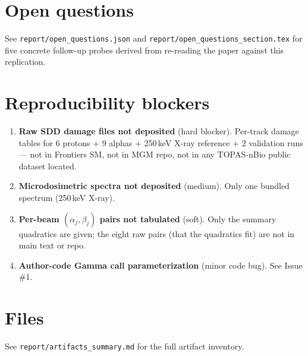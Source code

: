 \documentclass[11pt]{article}
\begin{document}
\section{Open questions}

See \texttt{report/open\_questions.json} and \texttt{report/open\_questions\_section.tex}
for five concrete follow-up probes derived from re-reading the paper against
this replication.

\section{Reproducibility blockers}

\begin{enumerate}
\item \textbf{Raw SDD damage files not deposited} (hard blocker). Per-track
  damage tables for 6 protons + 9 alphas + 250\,keV X-ray reference + 2 validation
  runs --- not in Frontiers SM, not in MGM repo, not in any TOPAS-nBio public
  dataset located.
\item \textbf{Microdosimetric spectra not deposited} (medium). Only one bundled
  spectrum (250\,keV X-ray).
\item \textbf{Per-beam $(\alpha_j, \beta_j)$ pairs not tabulated} (soft). Only
  the summary quadratics are given; the eight raw pairs (that the quadratics
  fit) are not in main text or repo.
\item \textbf{Author-code Gamma call parameterization} (minor code bug). See
  Issue \#1.
\end{enumerate}

\section{Files}

See \texttt{report/artifacts\_summary.md} for the full artifact inventory.
\end{document}
